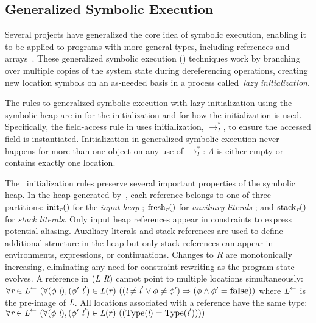 \subsection{Generalized Symbolic Execution}
\label{app:gse}
Several projects have generalized the core idea of symbolic execution,
enabling it to be applied to programs with more general types,
including references and
arrays~\cite{GSE03,KiasanKunit,Cadar:2008,Rosner:2015}. These
generalized symbolic execution (\gsetxt{}) techniques work by branching over
multiple copies of the system state during dereferencing operations, creating
new location symbols on an as-needed basis in a process called~\emph{lazy initialization}.

The rules to generalized symbolic execution with
lazy initialization using the symbolic heap are in
 for the initialization and  for
how the initialization is used. Specifically, the field-access rule in
 uses initialization, $\rightarrow_I^*$, to ensure
the accessed field is instantiated. Initialization in generalized
symbolic execution never happens for more than one object on any use
of $\rightarrow_I^*$: $\Lambda$ is either empty or contains exactly
one location.

The~\gsetxt{} initialization rules preserve several important properties of the symbolic heap. In the heap generated by~\gsetst{}, each reference belongs to one of three partitions: $\mathrm{init}_{\emph{r}}()$ for the \emph{input
  heap}
  ; $\mathrm{fresh}_{\emph{r}}()$ for \emph{auxiliary
  literals}
  ; and $\mathrm{stack}_{\emph{r}}()$ for \emph{stack
  literals}.
  Only input heap references appear in constraints to express potential aliasing.
  Auxiliary literals and stack references are used to define additional structure in the heap but only stack references can appear in environments, expressions, or continuations. Changes to $R$ are monotonically increasing, eliminating any need for constraint rewriting as the program state evolves.
A reference in $(\emph{L}\ \emph{R})$ cannot point to multiple locations simultaneously: 
$
\forall \cfgnt{r} \in \cfgnt{L}^\leftarrow\ (\forall (\phi\ \cfgnt{l}),(\phi^\prime\ \cfgnt{l}^\prime) \in \cfgnt{L}(r)\ (
(\cfgnt{l} \neq \cfgnt{l}^\prime \vee \phi \neq \phi^\prime) \Rightarrow (\phi \wedge \phi^\prime = \cfgt{false}))
$
where $\emph{L}^\leftarrow$ is the pre-image of $\emph{L}$. 
All locations associated with a reference have the same type:
$\forall \cfgnt{r} \in \cfgnt{L}^\leftarrow\ (\forall (\phi\ \cfgnt{l}),(\phi^\prime\ \cfgnt{l}^\prime) \in \cfgnt{L}(r)\ (
(\mathrm{Type}\lp\cfgnt{l}\rp = \mathrm{Type}\lp\cfgnt{l}^\prime\rp)))$

